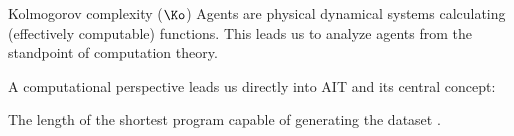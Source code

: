 \begin{frame}[label=intro3]{Kolmogorov complexity ($\Ko$)}
 Agents are physical dynamical systems calculating (effectively computable) functions.   This leads us to analyze agents from the standpoint of computation theory.
 
A computational perspective  leads us directly into AIT and its central concept: 


\begin{definition}
The length of the shortest program capable of generating  the dataset \citep{Kolomgorov1965}.  
\end{definition}
\end{frame}





